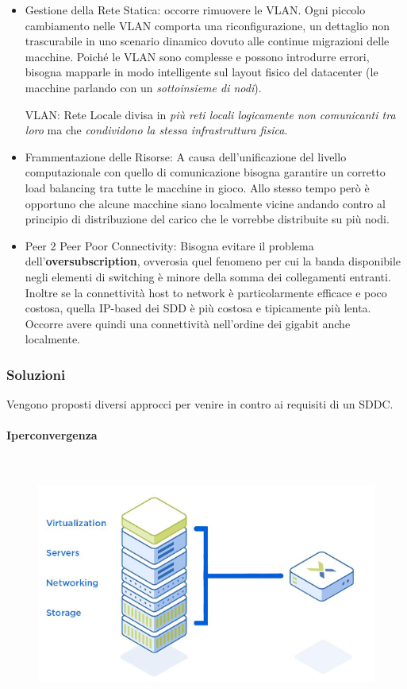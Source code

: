 \documentclass{article}
\begin{document}
		\begin{itemize}
		\item
		  Gestione della Rete Statica: occorre rimuovere
		  le VLAN. Ogni piccolo cambiamento nelle VLAN
		  comporta una riconfigurazione, un dettaglio non
		  trascurabile in uno scenario dinamico dovuto alle continue
		  migrazioni delle macchine. Poiché le VLAN sono
		  complesse e possono introdurre errori, bisogna
		  mapparle in modo intelligente sul layout fisico del
		  datacenter (le macchine parlando con un \emph{sottoinsieme di
		  nodi}).
		
		  VLAN: Rete Locale divisa in \emph{più reti locali
		  logicamente non comunicanti tra loro} ma che \emph{condividono la
		  stessa infrastruttura fisica}.
		\item
		  Frammentazione delle Risorse: A causa dell'unificazione del livello computazionale con quello di comunicazione bisogna garantire un corretto load balancing tra tutte le macchine in gioco. Allo stesso tempo però è opportuno che alcune macchine siano localmente vicine andando contro al principio di distribuzione del carico che le vorrebbe distribuite su più nodi.
		\item
		  Peer 2 Peer Poor Connectivity: Bisogna evitare il problema dell'\textbf{oversubscription}, ovverosia quel fenomeno per cui la banda disponibile negli elementi di switching è minore della somma dei collegamenti entranti. Inoltre se la connettività host to network è particolarmente efficace e poco costosa, quella IP-based dei SDD è più costosa e tipicamente più lenta. Occorre avere quindi una connettività nell'ordine dei gigabit anche localmente.
		\end{itemize}
		
		\subsubsection{Soluzioni}\label{soluzioni}
		
		Vengono proposti diversi approcci per venire in contro ai
		requisiti di un SDDC.
		
		\paragraph{Iperconvergenza}\label{iperconvergenza}\mbox{}\\
		\begin{figure}[ht]
			\centering
			\includegraphics[width=0.5\linewidth]{SAC_B7_hyperconvergence}
			\label{fig:sacb7hyperconvergence}
		\end{figure}
		
\end{document}
